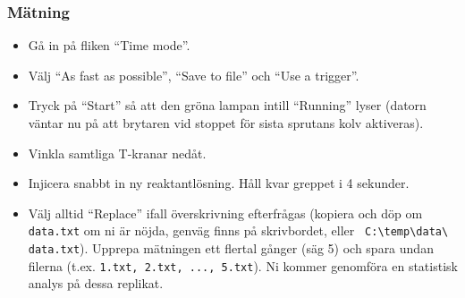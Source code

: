 \subsubsection{Mätning}
\begin{itemize}
\item Gå in på fliken ``Time mode''.
\item Välj ``As fast as possible'', ``Save to file'' och ``Use a trigger''.
\item Tryck på ``Start'' så att den gröna lampan intill ``Running'' lyser
  (datorn väntar nu på att brytaren vid stoppet för sista sprutans kolv aktiveras).
\item Vinkla samtliga T-kranar nedåt.
\item Injicera snabbt in ny reaktantlösning. Håll kvar greppet i 4 sekunder.
\item Välj alltid ``Replace'' ifall överskrivning efterfrågas (kopiera
  och döp om {\tt data.txt} om ni är nöjda, genväg finns på skrivbordet, eller {\tt
    C:\textbackslash temp\textbackslash data\textbackslash
    data.txt}). Upprepa mätningen ett flertal gånger (säg 5) och spara
  undan filerna (t.ex. {\tt 1.txt, 2.txt, ..., 5.txt}). Ni kommer
  genomföra en statistisk analys på dessa replikat.
\end{itemize}

